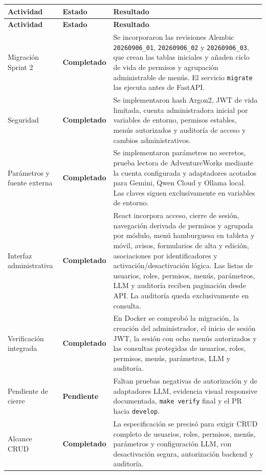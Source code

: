 \documentclass[11pt,letterpaper]{article}
\newcommand{\statusok}{\textcolor{deepgreen}{\textbf{Completado}}}
\newcommand{\statuspending}{\textcolor{warning}{\textbf{Pendiente}}}
\newcommand{\file}[1]{\texttt{#1}}
\begin{document}
\begin{longtable}{@{}p{}p{}p{}@{}}
  \toprule
  \textbf{Actividad} & \textbf{Estado} & \textbf{Resultado} \\
  \midrule
  \endfirsthead
  \toprule
  \textbf{Actividad} & \textbf{Estado} & \textbf{Resultado} \\
  \midrule
  \endhead
  Migración Sprint 2 & \statusok & Se incorporaron las revisiones Alembic \file{20260906\_01}, \file{20260906\_02} y \file{20260906\_03}, que crean las tablas iniciales y añaden ciclo de vida de permisos y agrupación administrable de menús. El servicio \file{migrate} las ejecuta antes de FastAPI. \\
  Seguridad & \statusok & Se implementaron hash Argon2, JWT de vida limitada, cuenta administradora inicial por variables de entorno, permisos estables, menús autorizados y auditoría de acceso y cambios administrativos. \\
  Parámetros y fuente externa & \statusok & Se implementaron parámetros no secretos, prueba lectora de AdventureWorks mediante la cuenta configurada y adaptadores acotados para Gemini, Qwen Cloud y Ollama local. Las claves siguen exclusivamente en variables de entorno. \\
  Interfaz administrativa & \statusok & React incorpora acceso, cierre de sesión, navegación derivada de permisos y agrupada por módulo, menú hamburguesa en tableta y móvil, avisos, formularios de alta y edición, asociaciones por identificadores y activación/desactivación lógica. Las listas de usuarios, roles, permisos, menús, parámetros, LLM y auditoría reciben paginación desde API. La auditoría queda exclusivamente en consulta. \\
  Verificación integrada & \statusok & En Docker se comprobó la migración, la creación del administrador, el inicio de sesión JWT, la sesión con ocho menús autorizados y las consultas protegidas de usuarios, roles, permisos, menús, parámetros, LLM y auditoría. \\
  Pendiente de cierre & \statuspending & Faltan pruebas negativas de autorización y de adaptadores LLM, evidencia visual responsive documentada, \file{make verify} final y el PR hacia \file{develop}. \\
  Alcance CRUD & \statusok & La especificación se precisó para exigir CRUD completo de usuarios, roles, permisos, menús, parámetros y configuración LLM, con desactivación segura, autorización backend y auditoría. \\
  \bottomrule
\end{longtable}
\end{document}

